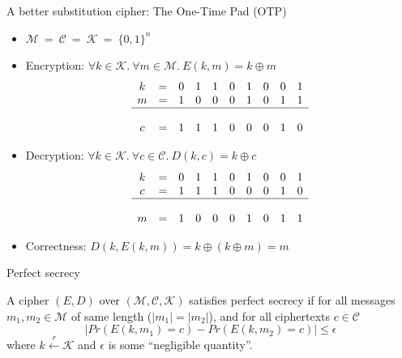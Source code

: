 \documentclass[aspectratio=169, lualatex, handout, 10pt,dvipsnames,svgnames]{beamer} %
\newcommand{\Kcal}{\mathcal{K}}
\newcommand{\Mcal}{\mathcal{M}}
\newcommand{\Ccal}{\mathcal{C}}
\begin{document}
\begin{frame}{A better substitution cipher: The One-Time Pad (OTP)}
  \pause

  \begin{itemize}

  \item $\Mcal\ =\ \Ccal\ =\ \Kcal\ =\ \{0, 1\}^n$
    \medskip{}
    \pause

  \item Encryption: $\forall k\in\Kcal.\ \forall m\in\Mcal.\ E(k, m) = k \oplus m$
    \pause
    \color{vert}
    \[
    \begin{array}[t]{ccccccccccccccccccccc}
      k & = & 0 & 1 & 1 & 0 & 1 & 0 & 0 & 1 \\
      m & = & 1 & 0 & 0 & 0 & 1 & 0 & 1 & 1 \\
      \hline \\
      c & = & 1 & 1 & 1 & 0 & 0 & 0 & 1 & 0
    \end{array}
    \]
    \color{black}
    \pause
  \vspace{-0.3cm}
  \item Decryption: $\forall k\in\Kcal.\ \forall c\in\Ccal.\ D(k, c) = k \oplus c$
    \pause
    \color{vert}
    \[
    \begin{array}[t]{ccccccccccccccccccccc}
      k & = & 0 & 1 & 1 & 0 & 1 & 0 & 0 & 1 \\
      c & = & 1 & 1 & 1 & 0 & 0 & 0 & 1 & 0 \\
      \hline \\
      m & = & 1 & 0 & 0 & 0 & 1 & 0 & 1 & 1
    \end{array}
    \]
    \color{black}
    \pause
    \vspace{-0.3cm}
  \item Correctness: $D(k, E(k, m)) = k \oplus (k\oplus m) = m$
  \end{itemize}
\end{frame}

\begin{frame}{Perfect secrecy}
  

  \begin{definition}
    A cipher $(E, D)$ over $(\Mcal, \Ccal, \Kcal)$ satisfies perfect secrecy if for all messages $m_1, m_2\in\Mcal$ of same length ($|m_1|=|m_2|$), and for all ciphertexts $c\in\Ccal$
    \[
    \left| Pr(E(k, m_1) = c) - Pr(E(k, m_2) = c)
    \right| \le \epsilon
    \]
    where $k \xleftarrow[]{r} \Kcal$ and $\epsilon$ is some ``negligible quantity''.
  \end{definition}

\end{frame}
\end{document}
